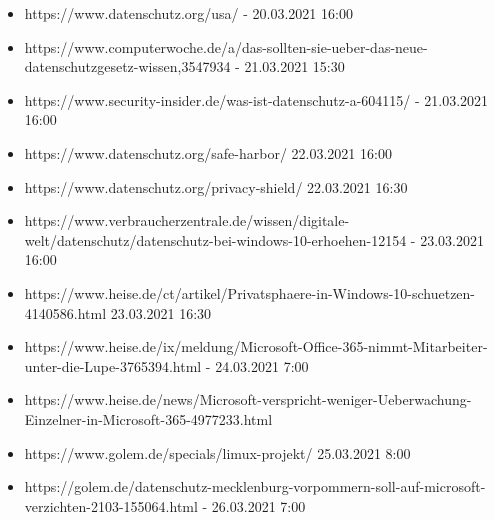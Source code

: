 \begin{itemize}
    \item https://www.datenschutz.org/usa/ - 20.03.2021 16:00
    \item https://www.computerwoche.de/a/das-sollten-sie-ueber-das-neue-datenschutzgesetz-wissen,3547934 - 21.03.2021 15:30
    \item https://www.security-insider.de/was-ist-datenschutz-a-604115/ - 21.03.2021 16:00
    \item https://www.datenschutz.org/safe-harbor/ 22.03.2021 16:00
    \item https://www.datenschutz.org/privacy-shield/ 22.03.2021 16:30
    \item https://www.verbraucherzentrale.de/wissen/digitale-welt/datenschutz/datenschutz-bei-windows-10-erhoehen-12154 - 23.03.2021 16:00
    \item https://www.heise.de/ct/artikel/Privatsphaere-in-Windows-10-schuetzen-4140586.html 23.03.2021 16:30
    \item https://www.heise.de/ix/meldung/Microsoft-Office-365-nimmt-Mitarbeiter-unter-die-Lupe-3765394.html - 24.03.2021 7:00
    \item https://www.heise.de/news/Microsoft-verspricht-weniger-Ueberwachung-Einzelner-in-Microsoft-365-4977233.html
    \item https://www.golem.de/specials/limux-projekt/ 25.03.2021 8:00
    \item https://golem.de/datenschutz-mecklenburg-vorpommern-soll-auf-microsoft-verzichten-2103-155064.html - 26.03.2021 7:00
\end{itemize}